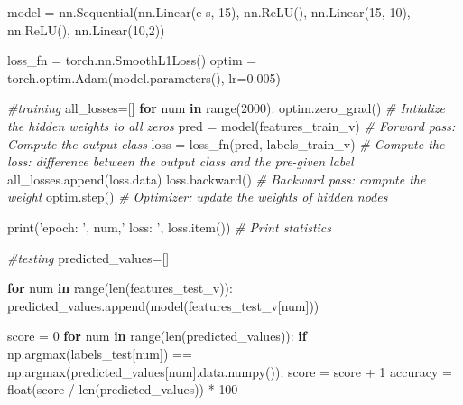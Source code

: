\documentclass[11pt]{article}
\newenvironment{Shaded}{}{}
\newcommand{\KeywordTok}[1]{\textcolor[rgb]{0.00,0.44,0.13}{\textbf{{#1}}}}
\newcommand{\DecValTok}[1]{\textcolor[rgb]{0.25,0.63,0.44}{{#1}}}
\newcommand{\FloatTok}[1]{\textcolor[rgb]{0.25,0.63,0.44}{{#1}}}
\newcommand{\StringTok}[1]{\textcolor[rgb]{0.25,0.44,0.63}{{#1}}}
\newcommand{\CommentTok}[1]{\textcolor[rgb]{0.38,0.63,0.69}{\textit{{#1}}}}
\newcommand{\NormalTok}[1]{{#1}}
\newcommand{\ControlFlowTok}[1]{\textcolor[rgb]{0.00,0.44,0.13}{\textbf{{#1}}}}
\newcommand{\OperatorTok}[1]{\textcolor[rgb]{0.40,0.40,0.40}{{#1}}}
\newcommand{\BuiltInTok}[1]{{#1}}
\begin{document}
\begin{Shaded}
\begin{Highlighting}[]
\NormalTok{        model }\OperatorTok{=}\NormalTok{ nn.Sequential(nn.Linear(e}\OperatorTok{-}\NormalTok{s, }\DecValTok{15}\NormalTok{),    }
\NormalTok{                     nn.ReLU(),}
\NormalTok{                     nn.Linear(}\DecValTok{15}\NormalTok{, }\DecValTok{10}\NormalTok{),}
\NormalTok{                     nn.ReLU(),}
\NormalTok{                     nn.Linear(}\DecValTok{10}\NormalTok{,}\DecValTok{2}\NormalTok{))}
        
\NormalTok{        loss_fn }\OperatorTok{=}\NormalTok{ torch.nn.SmoothL1Loss()}
\NormalTok{        optim }\OperatorTok{=}\NormalTok{ torch.optim.Adam(model.parameters(), lr}\OperatorTok{=}\FloatTok{0.005}\NormalTok{)}
        
        \CommentTok{#training}
\NormalTok{        all_losses}\OperatorTok{=}\NormalTok{[]}
        \ControlFlowTok{for}\NormalTok{ num }\KeywordTok{in} \BuiltInTok{range}\NormalTok{(}\DecValTok{2000}\NormalTok{):}
\NormalTok{            optim.zero_grad()                                 }\CommentTok{# Intialize the hidden weights to all zeros}
\NormalTok{            pred }\OperatorTok{=}\NormalTok{ model(features_train_v)                    }\CommentTok{# Forward pass: Compute the output class}
\NormalTok{            loss }\OperatorTok{=}\NormalTok{ loss_fn(pred, labels_train_v)              }\CommentTok{# Compute the loss: difference between the output class and                                                                      the pre-given label}
\NormalTok{            all_losses.append(loss.data)}
\NormalTok{            loss.backward()                                   }\CommentTok{# Backward pass: compute the weight}
\NormalTok{            optim.step()                                      }\CommentTok{# Optimizer: update the weights of hidden nodes}
            
            \BuiltInTok{print}\NormalTok{(}\StringTok{'epoch: '}\NormalTok{, num,}\StringTok{' loss: '}\NormalTok{, loss.item())      }\CommentTok{# Print statistics       }
            
        \CommentTok{#testing}
\NormalTok{        predicted_values}\OperatorTok{=}\NormalTok{[]}
    
        \ControlFlowTok{for}\NormalTok{ num }\KeywordTok{in} \BuiltInTok{range}\NormalTok{(}\BuiltInTok{len}\NormalTok{(features_test_v)):}
\NormalTok{            predicted_values.append(model(features_test_v[num]))}
        
\NormalTok{        score }\OperatorTok{=} \DecValTok{0}
        \ControlFlowTok{for}\NormalTok{ num }\KeywordTok{in} \BuiltInTok{range}\NormalTok{(}\BuiltInTok{len}\NormalTok{(predicted_values)):}
            \ControlFlowTok{if}\NormalTok{ np.argmax(labels_test[num]) }\OperatorTok{==}\NormalTok{ np.argmax(predicted_values[num].data.numpy()):}
\NormalTok{                score }\OperatorTok{=}\NormalTok{ score }\OperatorTok{+} \DecValTok{1}     
\NormalTok{        accuracy }\OperatorTok{=} \BuiltInTok{float}\NormalTok{(score }\OperatorTok{/} \BuiltInTok{len}\NormalTok{(predicted_values)) }\OperatorTok{*} \DecValTok{100}
        

\end{Highlighting}
\end{Shaded}
\end{document}
